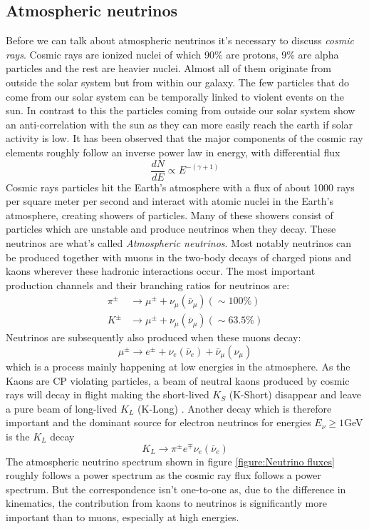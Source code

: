 \subsection{Atmospheric neutrinos}
\label{sec:AtmosphericNeutrinos}
Before we can talk about atmospheric neutrinos it's necessary to discuss \textit{cosmic rays}.
Cosmic rays are ionized nuclei of which 90\% are protons, 9\% are alpha particles and
the rest are heavier nuclei. Almost all of them originate from outside the solar system but
from within our galaxy. The few particles that do come from our solar system can be temporally
linked to violent events on the sun. In contrast to this the particles coming from outside
our solar system show an anti-correlation with the sun as they can more easily reach the earth
if solar activity is low.
It has been observed that the major components of the cosmic ray elements
roughly follow an inverse power law in energy, with differential flux \cite{gaisser_engel_resconi_2016}
\begin{equation}
	\frac{dN}{dE} \propto E^{-(\gamma+1)}
\end{equation}
Cosmic rays particles hit the Earth's atmosphere with a flux of about 1000 rays per
square meter per second and interact with atomic nuclei in the Earth's
atmosphere, creating showers of particles. Many of these showers consist of
particles which are unstable and produce neutrinos when they decay. These
neutrinos are what's called \textit{Atmospheric neutrinos}.  Most notably
neutrinos can be produced together with muons in the two-body decays of charged
pions and kaons wherever these hadronic interactions occur.  The most important
production channels and their branching ratios for neutrinos are:
\begin{align}
	\pi^\pm &\rightarrow \mu^\pm + \nu_\mu(\bar{\nu}_\mu) (\sim 100\%)\\
	K^\pm &\rightarrow \mu^\pm + \nu_\mu(\bar{\nu}_\mu) (\sim 63.5\%)
\end{align}
Neutrinos are subsequently also produced when these muons decay:
\begin{equation}
	\mu^\pm \rightarrow e^\pm + \nu_e(\bar{\nu}_e) + \bar{\nu}_\mu(\nu_\mu)
\end{equation}
which is a process mainly happening at low energies in the atmosphere.  As the
Kaons are CP violating particles, a beam of neutral kaons produced by cosmic
rays will decay in flight making the short-lived $K_S$ (K-Short) disappear and leave a
pure beam of long-lived $K_L$ (K-Long) \cite{griffiths2008introduction}.  Another decay
which is therefore important and the dominant source for electron neutrinos for
energies $E_\nu \geq 1$GeV is the $K_L$  decay
\begin{equation}
	K_L \rightarrow \pi^{\pm}e^\mp\nu_e(\bar{\nu}_e)
\end{equation}
The atmospheric neutrino spectrum shown in figure \ref{figure:Neutrino
fluxes} roughly follows a power spectrum as the cosmic ray flux follows a power
spectrum. But the correspondence isn't one-to-one as, due to the difference in
kinematics, the contribution from kaons to neutrinos is significantly more
important than to muons, especially at high energies.


